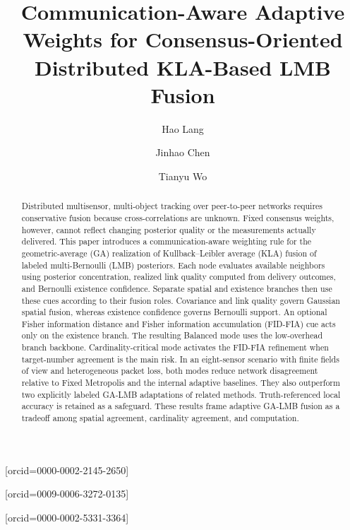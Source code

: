 \documentclass[a4paper,fleqn]{cas-sc}
\begin{document}
\let\WriteBookmarks\relax
\renewcommand{\topfraction}{0.9}
\renewcommand{\textfraction}{0.05}
\renewcommand{\floatpagefraction}{0.8}


\title[mode=title]{Communication-Aware Adaptive Weights for Consensus-Oriented\\Distributed KLA-Based LMB Fusion}

\author[1,2]{Hao Lang}[orcid=0000-0002-2145-2650]
\cormark[1]

\author[3]{Jinhao Chen}[orcid=0009-0006-3272-0135]

\author[3]{Tianyu Wo}[orcid=0000-0002-5331-3364]





\begin{abstract}
Distributed multisensor, multi-object tracking over peer-to-peer networks requires conservative fusion because cross-correlations are unknown. Fixed consensus weights, however, cannot reflect changing posterior quality or the measurements actually delivered. This paper introduces a communication-aware weighting rule for the geometric-average (GA) realization of Kullback--Leibler average (KLA) fusion of labeled multi-Bernoulli (LMB) posteriors. Each node evaluates available neighbors using posterior concentration, realized link quality computed from delivery outcomes, and Bernoulli existence confidence. Separate spatial and existence branches then use these cues according to their fusion roles. Covariance and link quality govern Gaussian spatial fusion, whereas existence confidence governs Bernoulli support. An optional Fisher information distance and Fisher information accumulation (FID-FIA) cue acts only on the existence branch. The resulting Balanced mode uses the low-overhead branch backbone. Cardinality-critical mode activates the FID-FIA refinement when target-number agreement is the main risk. In an eight-sensor scenario with finite fields of view and heterogeneous packet loss, both modes reduce network disagreement relative to Fixed Metropolis and the internal adaptive baselines. They also outperform two explicitly labeled GA-LMB adaptations of related methods. Truth-referenced local accuracy is retained as a safeguard. These results frame adaptive GA-LMB fusion as a tradeoff among spatial agreement, cardinality agreement, and computation.
\end{abstract}
\end{document}
